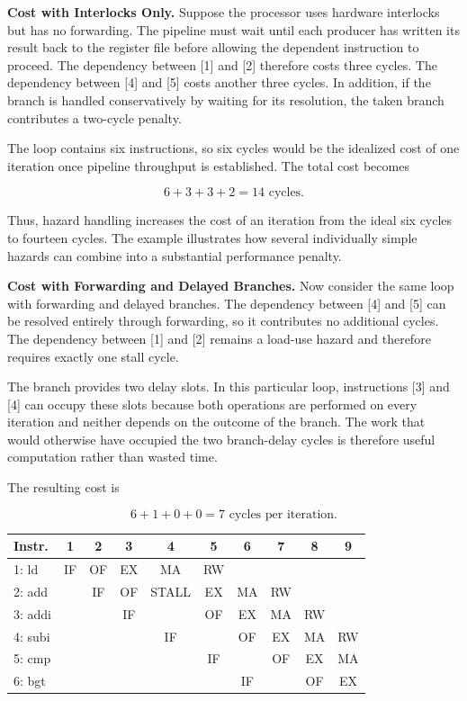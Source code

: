 \documentclass[12pt,a4paper]{report}
\begin{document}
\textbf{Cost with Interlocks Only.} Suppose the processor uses hardware interlocks but has no forwarding. The pipeline must wait until each producer has written its result back to the register file before allowing the dependent instruction to proceed. The dependency between [1] and [2] therefore costs three cycles. The dependency between [4] and [5] costs another three cycles. In addition, if the branch is handled conservatively by waiting for its resolution, the taken branch contributes a two-cycle penalty.

The loop contains six instructions, so six cycles would be the idealized cost of one iteration once pipeline throughput is established. The total cost becomes

\begin{equation}
6 + 3 + 3 + 2 = 14 \text{ cycles.}
\end{equation}

Thus, hazard handling increases the cost of an iteration from the ideal six cycles to fourteen cycles. The example illustrates how several individually simple hazards can combine into a substantial performance penalty.

\textbf{Cost with Forwarding and Delayed Branches.} Now consider the same loop with forwarding and delayed branches. The dependency between [4] and [5] can be resolved entirely through forwarding, so it contributes no additional cycles. The dependency between [1] and [2] remains a load-use hazard and therefore requires exactly one stall cycle.

The branch provides two delay slots. In this particular loop, instructions [3] and [4] can occupy these slots because both operations are performed on every iteration and neither depends on the outcome of the branch. The work that would otherwise have occupied the two branch-delay cycles is therefore useful computation rather than wasted time.

The resulting cost is

\begin{equation}
6 + 1 + 0 + 0 = 7 \text{ cycles per iteration.}
\end{equation}

\begin{center}
\begin{tabular}{lccccccccc}
\toprule
Instr. & 1 & 2 & 3 & 4 & 5 & 6 & 7 & 8 & 9 \\
\midrule
1: ld & IF & OF & EX & MA & RW & & & & \\
2: add & & IF & OF & STALL & EX & MA & RW & & \\
3: addi & & & IF & & OF & EX & MA & RW & \\
4: subi & & & & IF & & OF & EX & MA & RW \\
5: cmp & & & & & IF & & OF & EX & MA \\
6: bgt & & & & & & IF & & OF & EX \\
\bottomrule
\end{tabular}
\end{center}
\end{document}
